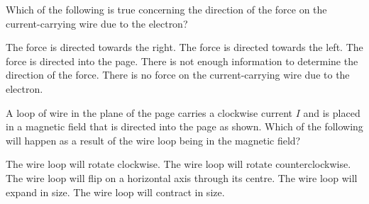 \documentclass{../../../oss-apphys-exam}
\begin{document}
\begin{questions}
  \question Which of the following is true concerning the direction of the
  force on the current-carrying wire due to the electron?
  \begin{center}
  \end{center}
  \begin{choices}
    \choice The force is directed towards the right.
    \choice The force is directed towards the left.
    \choice The force is directed into the page.
    \choice There is not enough information to determine the direction of the
    force.
    \choice There is no force on the current-carrying wire due to the
    electron.
  \end{choices}
  \newpage

  \question A loop of wire in the plane of the page carries a clockwise
  current $I$ and is placed in a magnetic field that is directed into the
  page as shown. Which of the following will happen as a result of the wire
  loop being in the magnetic field?
  \begin{choices}
    \choice The wire loop will rotate clockwise.
    \choice The wire loop will rotate counterclockwise.
    \choice The wire loop will flip on a horizontal axis through its centre.
    \choice The wire loop will expand in size.
    \choice The wire loop will contract in size.
  \end{choices}
  
%
%    
  

\end{questions}
\end{document}
